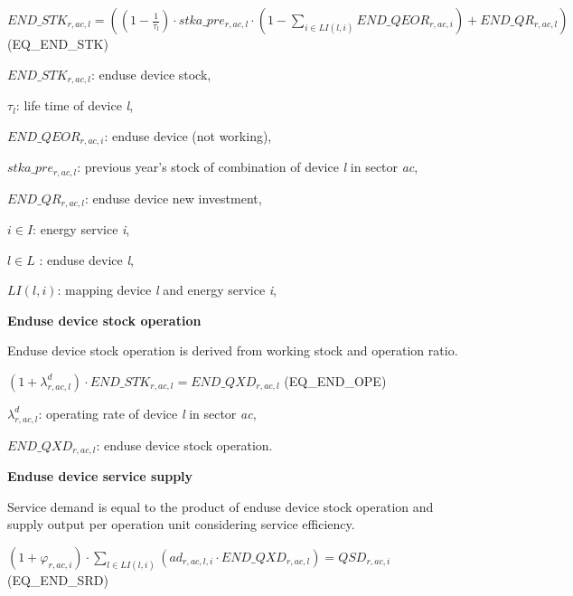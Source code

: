 \documentclass[10pt,a4paper,titlepage,dvipdfmx]{book}
\begin{document}
\begin{center}$END\_ STK_{r,ac,l}=\left(\left(1-\frac{1}{\tau _{l}}\right)\cdot stka\_ pre_{r,ac,l}\cdot \left(1-\sum _{i\in LI(l,i)}END\_ QEOR_{r,ac,i}\right)+END\_ QR_{r,ac,l}\right)$ (EQ\_END\_STK)
\end{center}

\begin{flushleft}
$END\_ STK_{r,ac,l}$: enduse device stock,

$\tau _{l}$: life time of device \textit{l},

$END\_ QEOR_{r,ac,i}$: enduse device (not working),

$stka\_ pre_{r,ac,l}$: previous year's stock of combination of device \textit{l} in sector \textit{ac},

$END\_ QR_{r,ac,l}$: enduse device new investment,

$i\in I$: energy service \textit{i},

$l\in L$ : enduse device \textit{l},

$LI(l,i)$: mapping device \textit{l} and energy service \textit{i},
\end{flushleft}

\begin{flushleft}\textbf{Enduse device stock operation}\end{flushleft}

Enduse device stock operation is derived from working stock and operation ratio.


\begin{center}$\left(1+\lambda _{r,ac,l}^{d}\right)\cdot END\_ STK_{r,ac,l}=END\_ QXD_{r,ac,l}$               (EQ\_END\_OPE)
\end{center}

\begin{flushleft}
$\lambda_{r,ac,l}^{d}$: operating rate of device \textit{l} in sector \textit{ac},

$END\_ QXD_{r,ac,l}$: enduse device stock operation.
\end{flushleft}

\begin{flushleft}\textbf{Enduse device service supply}\end{flushleft}

Service demand is equal to the product of enduse device stock operation and supply output per operation unit considering service efficiency. 


\begin{center}$\left(1+\varphi _{r,ac,i}\right)\cdot \sum _{l\in LI(l,i)}\left(ad_{r,ac,l,i}\cdot END\_ QXD_{r,ac,l}\right)=QSD_{r,ac,i}$               (EQ\_END\_SRD)
\end{center}
\end{document}
